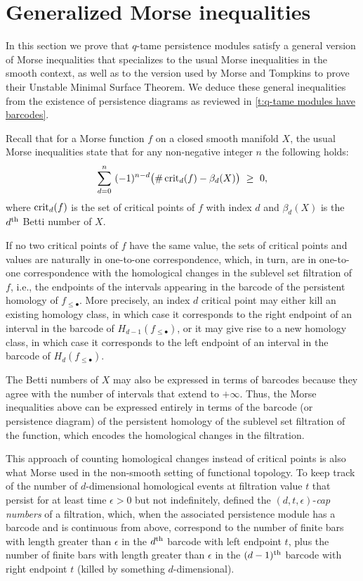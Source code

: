
\section{Generalized Morse inequalities} \label{s:inequalities}

In this section we prove that $q$-tame persistence modules satisfy a general version of Morse inequalities that specializes to the usual Morse inequalities in the smooth context, as well as to the version used by Morse and Tompkins to prove their Unstable Minimal Surface Theorem.
We deduce these general inequalities from the existence of persistence diagrams as reviewed in \cref{t:q-tame modules have barcodes}.

Recall that for a Morse function $f$ on a closed smooth manifold $X$, the usual Morse inequalities state that for any non-negative integer $n$ the following holds:
\begin{equation} \label{e:classical morse inequalities}
\sum_{d=0}^n \ (-1)^{n-d} \big( \# \crit_{d}(f) - \beta_{d}(X) \big) \ \geq \ 0,
\end{equation}
where $\operatorname{crit}_{d}(f)$ is the set of critical points of $f$ with index $d$ and $\beta_{d}(X)$ is the $d^{\mathrm{th}}$ Betti number of $X$.

If no two critical points of $f$ have the same value, the sets of critical points and values are naturally in one-to-one correspondence, which, in turn, are in one-to-one correspondence with the homological changes in the sublevel set filtration of $f$, i.e., the endpoints of the intervals appearing in the barcode of the persistent homology of $f_{\leq \bullet}$.
More precisely, an index $d$ critical point may either kill an existing homology class, in which case it corresponds to the right endpoint of an interval in the barcode of $H_{d-1}(f_{\leq \bullet})$, or it may give rise to a new homology class, in which case it corresponds to the left endpoint of an interval in the barcode of $H_d(f_{\leq \bullet})$.

The Betti numbers of $X$ may also be expressed in terms of barcodes because they agree with the number of intervals that extend to $+\infty$.
Thus, the Morse inequalities above can be expressed entirely in terms of the barcode (or persistence diagram) of the persistent homology of the sublevel set filtration of the function, which encodes the homological changes in the filtration.

This approach of counting homological changes instead of critical points is also what Morse used in the non-smooth setting of functional topology.
To keep track of the number of $d$-dimensional homological events at filtration value $t$ that persist for at least time $\epsilon > 0$ but not indefinitely, \cite{Morse.1940} defined the $(d, t, \epsilon)$-\emph{cap numbers} of a filtration, which, when the associated persistence module has a barcode and is continuous from above, correspond to the number of finite bars with length greater than $\epsilon$ in the $d^{\mathrm{th}}$ barcode with left endpoint $t$, plus the number of finite bars with length greater than $\epsilon$ in the $(d-1)^{\mathrm{th}}$ barcode with right endpoint $t$ (killed by something $d$-dimensional).

